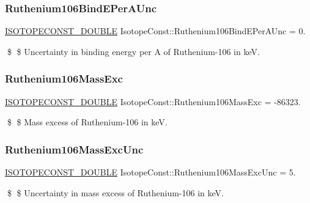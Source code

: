 \subsubsection{\texorpdfstring{Ruthenium106\+Bind\+E\+Per\+A\+Unc}{Ruthenium106BindEPerAUnc}}
{\footnotesize\ttfamily \mbox{\hyperlink{group___isotope_const-_macros_ga8f45a7272ce02c0b4c65c44636ed719a}{I\+S\+O\+T\+O\+P\+E\+C\+O\+N\+S\+T\+\_\+\+D\+O\+U\+B\+LE}} Isotope\+Const\+::\+Ruthenium106\+Bind\+E\+Per\+A\+Unc = 0.}

\$ \$ Uncertainty in binding energy per A of Ruthenium-\/106 in keV. \mbox{\label{group___isotope_const-_ruthenium-_ru106_ga529e866c4851ceada80459eb55db56cc}} 
\subsubsection{\texorpdfstring{Ruthenium106\+Mass\+Exc}{Ruthenium106MassExc}}
{\footnotesize\ttfamily \mbox{\hyperlink{group___isotope_const-_macros_ga8f45a7272ce02c0b4c65c44636ed719a}{I\+S\+O\+T\+O\+P\+E\+C\+O\+N\+S\+T\+\_\+\+D\+O\+U\+B\+LE}} Isotope\+Const\+::\+Ruthenium106\+Mass\+Exc = -\/86323.}

\$ \$ Mass excess of Ruthenium-\/106 in keV. \mbox{\label{group___isotope_const-_ruthenium-_ru106_gade8ff00d46cf2e417e6b43d654edf3a6}} 
\subsubsection{\texorpdfstring{Ruthenium106\+Mass\+Exc\+Unc}{Ruthenium106MassExcUnc}}
{\footnotesize\ttfamily \mbox{\hyperlink{group___isotope_const-_macros_ga8f45a7272ce02c0b4c65c44636ed719a}{I\+S\+O\+T\+O\+P\+E\+C\+O\+N\+S\+T\+\_\+\+D\+O\+U\+B\+LE}} Isotope\+Const\+::\+Ruthenium106\+Mass\+Exc\+Unc = 5.}

\$ \$ Uncertainty in mass excess of Ruthenium-\/106 in keV. \mbox{\label{group___isotope_const-_ruthenium-_ru106_gaf02797c366b735f289b2ef483376e437}} 
